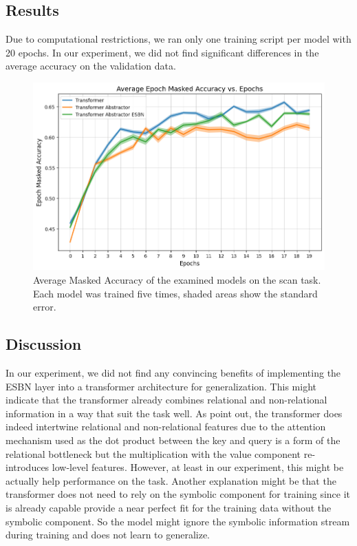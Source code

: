 \subsection{Results}
Due to computational restrictions, we ran only one training script per model with 20 epochs. In our experiment, we did not find significant differences in the average accuracy on the validation data.

\begin{figure}
    \centering
    \includegraphics[width=1.0\linewidth]{images/avg_epoch_acc_tf.png}
    \caption{Average Masked Accuracy of the examined models on the scan task. Each model was trained five times, shaded areas show the standard error. }
\end{figure}

\subsection{Discussion}
In our experiment, we did not find any convincing benefits of implementing the ESBN layer into a transformer architecture for generalization. \newline
This might indicate that the transformer already combines relational and non-relational information in a way that suit the task well. As \textcite{altabaa_abstractors_2023} point out, the transformer does indeed intertwine relational and non-relational features due to the attention mechanism used as the dot product between the key and query is a form of the relational bottleneck but the multiplication with the value component re-introduces low-level features. However, at least in our experiment, this might be actually help performance on the task. \newline
Another explanation might be that the transformer does not need to rely on the symbolic component for training since it is already capable provide a near perfect fit for the training data without the symbolic component. So the model might ignore the symbolic information stream during training and does not learn to generalize.


